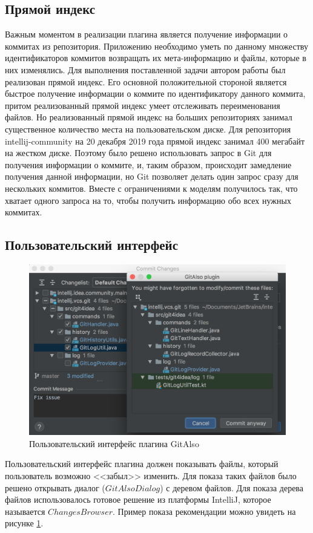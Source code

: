 \subsection{Прямой индекс}\label{forward-index}
Важным моментом в реализации плагина является получение информации о коммитах из репозитория. Приложению необходимо уметь по данному множеству идентификаторов коммитов возвращать их мета-информацию и файлы, которые в них изменялись. Для выполнения поставленной задачи автором работы был реализован прямой индекс. Его основной положительной стороной является быстрое получение информации о коммите по идентификатору данного коммита, притом реализованный прямой индекс умеет отслеживать переименования файлов. Но реализованный прямой индекс на больших репозиториях занимал существенное количество места на пользовательском диске. Для репозитория intellij-community на 20 декабря 2019 года прямой индекс занимал 400 мегабайт на жестком диске. Поэтому было решено использовать запрос в Git для получения информации о коммите, и, таким образом, происходит замедление получения данной информации, но Git позволяет делать один запрос сразу для нескольких коммитов. Вместе с ограничениями к моделям получилось так, что хватает одного запроса на то, чтобы получить информацию обо всех нужных коммитах.
\subsection{Пользовательский интерфейс}\label{git-also-ui}
\begin{figure}[!h]
\caption{Пользовательский интерфейс плагина GitAlso}\label{git-also-screen}
\centering
\includegraphics[scale=0.6]{images/GitAlso.png}
\end{figure}
Пользовательский интерфейс плагина должен показывать файлы, который пользователь возможно <<забыл>> изменить. Для показа таких файлов было решено открывать диалог ($GitAlsoDialog$) с деревом файлов. Для показа дерева файлов использовалось готовое решение из платформы IntelliJ, которое называется $ChangesBrowser$. Пример показа рекомендации можно увидеть на рисунке  \ref{git-also-screen}.
